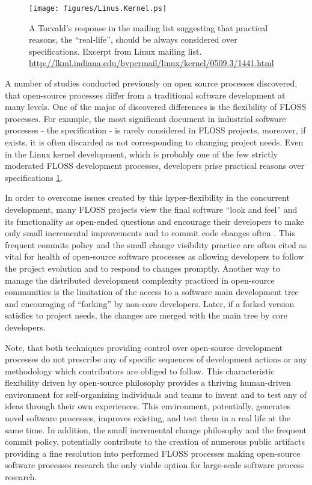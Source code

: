 \begin{figure}[ht!]
   \centering
   \texttt{[image: figures/Linus.Kernel.ps]}
   \caption{A Torvald's response in the mailing list suggesting that practical reasons, the ``real-life'', 
   should be always considered over specifications.
   Excerpt from Linux mailing list. \url{http://lkml.indiana.edu/hypermail/linux/kernel/0509.3/1441.html}}
   \label{fig:kernel}
\end{figure}

A number of studies conducted previously on open source processes discovered, that open-source processes 
differ from a traditional software development at many levels. One of the major of discovered differences 
is the flexibility of FLOSS processes. For example, the most significant document in industrial software 
processes - the specification - is rarely considered in FLOSS projects, moreover, if exists, it is often 
discarded as not corresponding to changing project needs. Even in the Linux kernel development, which is 
probably one of the few strictly moderated FLOSS development processes, developers prise practical reasons 
over specifications \ref{fig:kernel}.

In order to overcome issues created by this hyper-flexibility in the concurrent development, many FLOSS 
projects view the final software ``look and feel'' and its functionality as open-ended questions and 
encourage their developers to make only small incremental improvements and to commit code changes often 
\cite{so-checkin} \cite{git-best-practices1}. This frequent commits policy and the small change visibility 
practice are often cited as vital for health of open-source software processes 
\cite{checkin-ch-2012} \cite{checkin-dgd-2008} as allowing developers to follow the project evolution
and to respond to changes promptly.
Another way to manage the distributed development complexity practiced in open-source communities is the 
limitation of the access to a software main development tree and encouraging of ``forking'' by non-core developers. 
Later, if a forked version satisfies to project needs, the changes are merged with the main tree by core developers.

Note, that both techniques providing control over open-source development processes do not prescribe any of specific 
sequences of development actions or any methodology which contributors are obliged to follow.
This characteristic flexibility driven by open-source philosophy provides a thriving human-driven environment for 
self-organizing individuals and teams to invent and to test any of ideas through their own experiences. 
This environment, potentially, generates novel software processes, improves existing, and test them in a real life
at the same time. 
In addition, the small incremental change philosophy and the frequent commit policy, potentially contribute to the 
creation of numerous public artifacts providing a fine resolution into performed FLOSS processes making open-source 
software processes research the only viable option for large-scale software process research.


